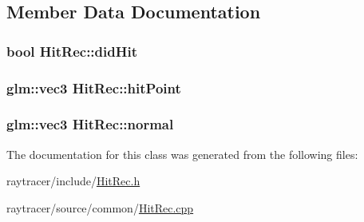 \subsection{Member Data Documentation}
\hypertarget{class_hit_rec_a7b6523b2c80ecb6c74e842e6f0e141bc}{
\subsubsection[{did\-Hit}]{\setlength{\rightskip}{0pt plus 5cm}bool Hit\-Rec\-::did\-Hit}}\label{class_hit_rec_a7b6523b2c80ecb6c74e842e6f0e141bc}
\hypertarget{class_hit_rec_af469c5c83f30778acc72e52161304b0e}{
\subsubsection[{hit\-Point}]{\setlength{\rightskip}{0pt plus 5cm}glm\-::vec3 Hit\-Rec\-::hit\-Point}}\label{class_hit_rec_af469c5c83f30778acc72e52161304b0e}
\hypertarget{class_hit_rec_ae3497f607cf5bc135efe6a95f2f1518c}{
\subsubsection[{normal}]{\setlength{\rightskip}{0pt plus 5cm}glm\-::vec3 Hit\-Rec\-::normal}}\label{class_hit_rec_ae3497f607cf5bc135efe6a95f2f1518c}


The documentation for this class was generated from the following files\-:\begin{DoxyCompactItemize}
\item 
raytracer/include/\hyperlink{_hit_rec_8h}{Hit\-Rec.\-h}\item 
raytracer/source/common/\hyperlink{_hit_rec_8cpp}{Hit\-Rec.\-cpp}\end{DoxyCompactItemize}
